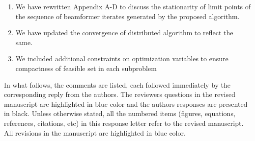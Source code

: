 \begin{enumerate}
	\item We have rewritten Appendix A-D to discuss the stationarity of limit points of the sequence of beamformer iterates generated by the proposed algorithm.
	\item We have updated the convergence of distributed algorithm to reflect the same.
	\item We included additional constraints on optimization variables to ensure compactness of feasible set in each subproblem
\end{enumerate}

In what follows, the comments are listed, each followed immediately by the corresponding reply from the authors. The reviewers questions in the revised manuscript are highlighted in blue color and the authors responses are presented in black. Unless otherwise stated, all the numbered items (figures, equations, references, citations, etc) in this response letter refer to the revised manuscript. All revisions in the manuscript are highlighted in blue color.